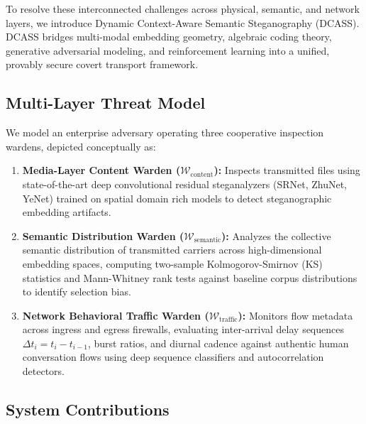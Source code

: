 \documentclass[11pt,journal,onecolumn]{IEEEtran}\linespread{1.3}
\begin{document}
To resolve these interconnected challenges across physical, semantic, and network layers, we introduce Dynamic Context-Aware Semantic Steganography (DCASS). DCASS bridges multi-modal embedding geometry, algebraic coding theory, generative adversarial modeling, and reinforcement learning into a unified, provably secure covert transport framework.

\subsection{Multi-Layer Threat Model}

We model an enterprise adversary operating three cooperative inspection wardens, depicted conceptually as:
\begin{enumerate}
    \item \textbf{Media-Layer Content Warden ($\mathcal{W}_{\text{content}}$):} Inspects transmitted files using state-of-the-art deep convolutional residual steganalyzers (SRNet, ZhuNet, YeNet) trained on spatial domain rich models to detect steganographic embedding artifacts.
    \item \textbf{Semantic Distribution Warden ($\mathcal{W}_{\text{semantic}}$):} Analyzes the collective semantic distribution of transmitted carriers across high-dimensional embedding spaces, computing two-sample Kolmogorov-Smirnov (KS) statistics and Mann-Whitney rank tests against baseline corpus distributions to identify selection bias.
    \item \textbf{Network Behavioral Traffic Warden ($\mathcal{W}_{\text{traffic}}$):} Monitors flow metadata across ingress and egress firewalls, evaluating inter-arrival delay sequences $\Delta t_i = t_i - t_{i-1}$, burst ratios, and diurnal cadence against authentic human conversation flows using deep sequence classifiers and autocorrelation detectors.
\end{enumerate}

\subsection{System Contributions}
\end{document}
